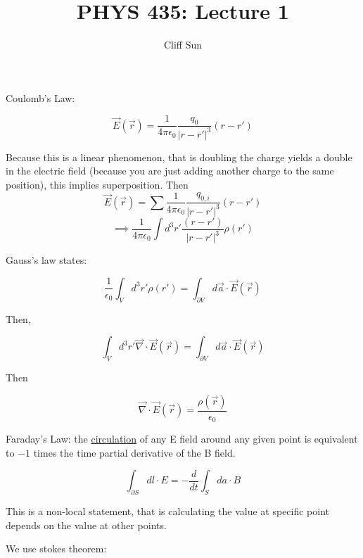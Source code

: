 \documentclass{article}
\title{PHYS 435: Lecture 1}
\author{Cliff Sun}
\newtheorem{one minute paper}[theorem]{One Minute Paper}
\begin{document}
\maketitle

Coulomb's Law:

\begin{equation}
    \vec{E}(\vec{r}) = \frac{1}{4\pi\epsilon_0}\frac{q_0}{|r-r'|^3}(r-r')
\end{equation}

Because this is a linear phenomenon, that is doubling the charge yields a double in the electric field (because you are just adding another charge to the same position), this implies superposition.
Then 
\begin{equation}
    \vec{E}(\vec{r}) = \sum\frac{1}{4\pi\epsilon_0}\frac{q_{0,i}}{|r-r'|^3}(r-r')
\end{equation}
\begin{equation}
    \implies \frac{1}{4\pi\epsilon_0}\int d^{3}r'\frac{(r-r')}{|r-r'|^3}\rho(r')
\end{equation}

Gauss's law states:

\begin{equation}
    \frac{1}{\epsilon_0}\int_V d^3r' \rho(r') = \int_{\partial V} d\vec{a} \cdot \vec{E}(\vec{r})
\end{equation}

Then, 

\begin{equation}
    \int_V d^3r' \vec{\nabla} \cdot \vec{E}(\vec{r}) = \int_{\partial V}d\vec{a} \cdot \vec{E}(\vec{r})
\end{equation}

Then 

\begin{equation}
    \vec{\nabla} \cdot \vec{E}(\vec{r}) = \frac{\rho(\vec{r})}{\epsilon_0}
\end{equation}

Faraday's Law: the \underline{circulation} of any E field around any given point is equivalent to $-1$ times the time partial derivative of the B field. 

\begin{equation}
    \int_{\partial S}dl \cdot E = -\frac{d}{dt}\int_S da \cdot B
\end{equation}

This is a non-local statement, that is calculating the value at specific point depends on the value at other points. 

We use stokes theorem:
\end{document}
